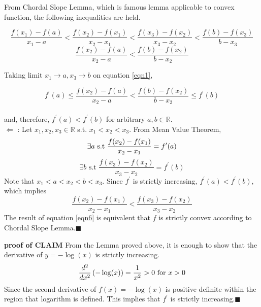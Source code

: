 \documentclass[10pt]{article}
\begin{document}
From Chordal Slope Lemma, which is famous lemma applicable to convex function, the following inequalities are held.

\begin{equation}
    \frac{f(x_1) - f(a)}{x_1 - a} < \frac{f(x_2) - f(x_1)}{x_2 - x_1}<\frac{f(x_3) - f(x_2)}{x_3 - x_2} < \frac{f(b) - f(x_3)}{b - x_3}
    \label{eqn1}
\end{equation} 
\begin{equation}
    \frac{f(x_2) - f(a)}{x_2 - a} < \frac{f(b) - f(x_2)}{b - x_2}
\end{equation} 

Taking limit $x_1 \rightarrow a, x_3 \rightarrow b$ on equation \ref{eqn1}, 

\begin{equation}
    f^\prime(a) \le \frac{f(x_2) - f(a)}{x_2 - a} < \frac{f(b) - f(x_2)}{b - x_2} \le f^\prime(b)
\end{equation}\\
and, therefore, $f^\prime(a)<f^\prime(b)$ for arbitrary $a,b\in\mathbb{R}$.\\

$\Longleftarrow$ : Let $x_1, x_2, x_3 \in \mathbb{R}$ s.t. $x_1<x_2<x_3$. From Mean Value Theorem,
\begin{equation}
    \exists a \text{ s.t } \frac{f(x_2) - f(x_1)}{x_2 - x_1} = f^\prime(a) \\
\end{equation}
\begin{equation}
    \exists b \text{ s.t } \frac{f(x_3) - f(x_2)}{x_3 - x_2} = f^\prime(b)
\end{equation}
Note that $x_1<a<x_2<b<x_3$. Since $f^\prime$ is strictly increasing, $f^\prime(a) < f^\prime(b)$, which implies 
\begin{equation}
    \frac{f(x_2) - f(x_1)}{x_2 - x_1} < \frac{f(x_3) - f(x_2)}{x_3 - x_2} 
    \label{eqn6}
\end{equation}
The result of equation \ref{eqn6} is equivalent that $f$ is strictly convex according to Chordal Slope Lemma.$\blacksquare$ 

\textbf{proof of CLAIM}
From the Lemma proved above, it is enough to show that the derivative of $y = -\log(x)$ is strictly increasing. 
\begin{equation}
    {d^2 \over dx^2} \left(-\log(x)\right) = \frac{1}{x^2} >0 \text{ for } x>0
\end{equation}
Since the second derivative of $f(x) = -\log(x)$ is positive definite within the region that logarithm is defined. 
This implies that $f^\prime$ is strictly increasing.$\blacksquare$
\end{document}
